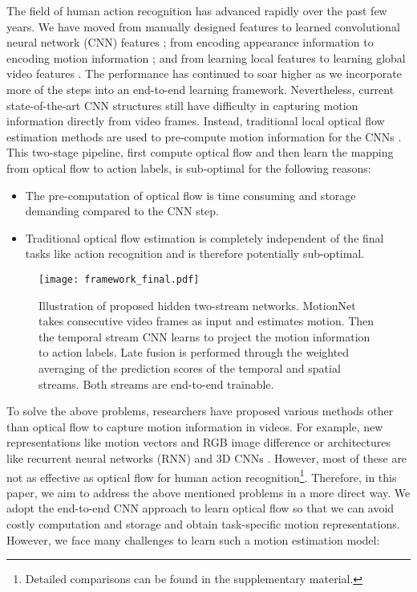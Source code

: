 \documentclass[runningheads]{llncs}
\begin{document}
	The field of human action recognition has advanced rapidly over the past few years. We have moved from manually designed features \cite{idtfWang2013,videoDarwin} to learned convolutional neural network (CNN) features \cite{KarpathyCVPR14,c3d2015}; from encoding appearance information to encoding motion information \cite{twostream2014}; and from learning local features to learning global video features \cite{TSN2016,dovf_lan_2017}. The performance has continued to soar higher as we incorporate more of the steps into an end-to-end learning framework. Nevertheless, current state-of-the-art CNN structures still have difficulty in capturing motion information directly from video frames. Instead, traditional local optical flow estimation methods are used to pre-compute motion information for the CNNs \cite{twostream2014}. This two-stage pipeline, first compute optical flow and then learn the mapping from optical flow to action labels, is sub-optimal for the following reasons:
	
	\begin{itemize}
		\item The pre-computation of optical flow is time consuming and storage demanding compared to the CNN step. 
\item Traditional optical flow estimation is completely independent of the final tasks like action recognition and is therefore potentially sub-optimal. 
\end{itemize}
	
	\begin{figure}[t]
		\centering
		\texttt{[image: framework\_final.pdf]}
		\caption{Illustration of proposed hidden two-stream networks. MotionNet takes consecutive video frames as input and estimates motion. Then the temporal stream CNN learns to project the motion information to action labels. Late fusion is performed through the weighted averaging of the prediction scores of the temporal and spatial streams. Both streams are end-to-end trainable.}
		\label{fig:framework}
	\end{figure}
	
	{\color{black} To solve the above problems}, researchers have proposed various methods other than optical flow to capture motion information in videos. For example, new representations like motion vectors \cite{EMV_cvpr16,wu_compressed_action_17} and RGB image difference \cite{TSN2016} or architectures like recurrent neural networks (RNN) \cite{beyondshort2015} and 3D CNNs \cite{c3d2015,qiu_P3D_iccv17,spatiotemporal_du_cvpr2018,spatiotemporal_xie}. However, most of these are not as effective as optical flow for human action recognition\footnote{Detailed comparisons can be found in the supplementary material.}. Therefore, in this paper, we aim to address the above mentioned problems in a more direct way. We adopt the end-to-end CNN approach to learn optical flow so that we can avoid costly computation and storage and obtain task-specific motion representations. 
However, we face many challenges to learn such a motion estimation model: 
		
\end{document}
